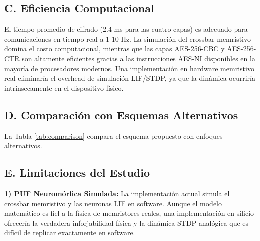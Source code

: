\subsection*{C. Eficiencia Computacional}

El tiempo promedio de cifrado (2.4 ms para las cuatro capas) es adecuado para comunicaciones en tiempo real a 1-10 Hz. La simulación del crossbar memristivo domina el costo computacional, mientras que las capas AES-256-CBC y AES-256-CTR son altamente eficientes gracias a las instrucciones AES-NI disponibles en la mayoría de procesadores modernos. Una implementación en hardware memristivo real eliminaría el overhead de simulación LIF/STDP, ya que la dinámica ocurriría intrínsecamente en el dispositivo físico.

\subsection*{D. Comparación con Esquemas Alternativos}

La Tabla \ref{tab:comparison} compara el esquema propuesto con enfoques alternativos.

\begin{table}[H]
    \centering\footnotesize\setlength{\tabcolsep}{3pt}
    \caption{Comparación de esquemas criptográficos para drones}
    \label{tab:comparison}
\end{table}

\subsection*{E. Limitaciones del Estudio}

\textbf{1) PUF Neuromórfica Simulada:} La implementación actual simula el crossbar memristivo y las neuronas LIF en software. Aunque el modelo matemático es fiel a la física de memristores reales, una implementación en silicio ofrecería la verdadera inforjabilidad física y la dinámica STDP analógica que es difícil de replicar exactamente en software.

